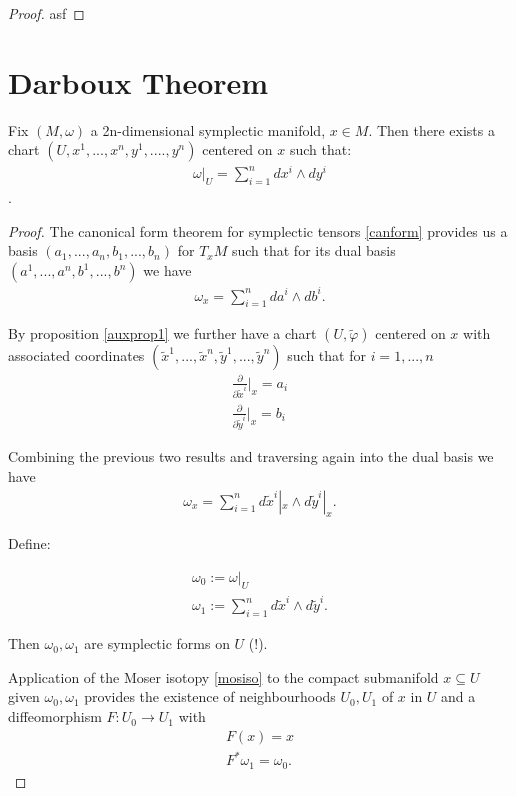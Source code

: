 \begin{proof}
asf
\end{proof}

\section{Darboux Theorem}

\begin{theorem}
Fix $(M , \omega)$ a 2n-dimensional symplectic manifold, $x \in M$. Then there exists a chart $(U, x^1, ... , x^n, y^1, .... , y^n)$ centered on $x$ such that:
\begin{align*}
\omega |_U = \sum^n_{i=1} dx^i \wedge dy^i
\end{align*}.
\end{theorem}

\begin{proof}
The canonical form theorem for symplectic tensors \ref{canform} provides us a basis $(a_1, ... , a_n, b_1, ... , b_n)$ for $T_x M$ such that for its dual basis $(a^1, ... , a^n, b^1, ... , b^n)$ we have
\begin{align*}
\omega_x = \sum^n_{i=1} da^i \wedge db^i.
\end{align*}

By proposition \ref{auxprop1} we further have a chart $(U, \tilde{\varphi})$ centered on $x$ with associated coordinates $({\tilde{x}}^1, ... , {\tilde{x}}^n ,{\tilde{y}}^1, ... , {\tilde{y}}^n)$ such that for $i = 1,..., n$
\begin{align*}
\frac{\partial}{\partial \tilde{x}^i} \bigg\vert_x = a_i  \\
\frac{\partial}{\partial \tilde{y}^i} \bigg\vert_x = b_i 
\end{align*}

Combining the previous two results and traversing again into the dual basis we have
\begin{align*}
\omega_x = \sum^n_{i=1} d\tilde{x}^i|_x \wedge d\tilde{y}^i|_x.
\end{align*}

Define:

\begin{align*}
\omega_0 := \omega|_U \\
\omega_1 := \sum^n_{i=1} d\tilde{x}^i \wedge d\tilde{y}^i.
\end{align*}

Then $\omega_0 , \omega_1$ are symplectic forms on $U$ (!). 

Application of the Moser isotopy \ref{mosiso} to the compact submanifold ${x} \subseteq U$ given $\omega_0, \omega_1$ provides the existence of neighbourhoods $U_0, U_1$ of $x$ in $U$ and a diffeomorphism $F: U_0 \to U_1$ with
\begin{align*}
F(x) = x \\
F^* \omega_1 = \omega_0.
\end{align*}


\end{proof}
